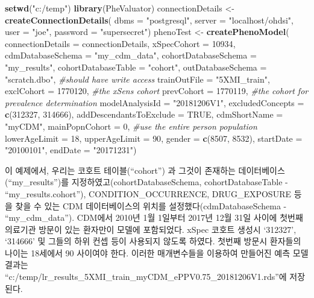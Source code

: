 \documentclass[11pt]{book}
\newenvironment{Shaded}{\begin{snugshade}}{\end{snugshade}}
\newcommand{\KeywordTok}[1]{\textcolor[rgb]{0.13,0.29,0.53}{\textbf{#1}}}
\newcommand{\DataTypeTok}[1]{\textcolor[rgb]{0.13,0.29,0.53}{#1}}
\newcommand{\DecValTok}[1]{\textcolor[rgb]{0.00,0.00,0.81}{#1}}
\newcommand{\StringTok}[1]{\textcolor[rgb]{0.31,0.60,0.02}{#1}}
\newcommand{\CommentTok}[1]{\textcolor[rgb]{0.56,0.35,0.01}{\textit{#1}}}
\newcommand{\OtherTok}[1]{\textcolor[rgb]{0.56,0.35,0.01}{#1}}
\newcommand{\NormalTok}[1]{#1}
\theoremstyle{definition}
\theoremstyle{definition}
\theoremstyle{definition}
\theoremstyle{remark}
\begin{document}
\begin{Shaded}
\begin{Highlighting}[]
\KeywordTok{setwd}\NormalTok{(}\StringTok{"c:/temp"}\NormalTok{)}
\KeywordTok{library}\NormalTok{(PheValuator)}
\NormalTok{connectionDetails <-}\StringTok{ }\KeywordTok{createConnectionDetails}\NormalTok{(}
  \DataTypeTok{dbms =} \StringTok{"postgresql"}\NormalTok{,}
  \DataTypeTok{server =} \StringTok{"localhost/ohdsi"}\NormalTok{,}
  \DataTypeTok{user =} \StringTok{"joe"}\NormalTok{,}
  \DataTypeTok{password =} \StringTok{"supersecret"}\NormalTok{)}
\NormalTok{phenoTest <-}\StringTok{ }\KeywordTok{createPhenoModel}\NormalTok{(}
  \DataTypeTok{connectionDetails =}\NormalTok{ connectionDetails,}
  \DataTypeTok{xSpecCohort =} \DecValTok{10934}\NormalTok{,}
  \DataTypeTok{cdmDatabaseSchema =} \StringTok{"my_cdm_data"}\NormalTok{,}
  \DataTypeTok{cohortDatabaseSchema =} \StringTok{"my_results"}\NormalTok{,}
  \DataTypeTok{cohortDatabaseTable =} \StringTok{"cohort"}\NormalTok{,}
  \DataTypeTok{outDatabaseSchema =} \StringTok{"scratch.dbo"}\NormalTok{, }\CommentTok{#should have write access}
  \DataTypeTok{trainOutFile =} \StringTok{"5XMI_train"}\NormalTok{,}
  \DataTypeTok{exclCohort =} \DecValTok{1770120}\NormalTok{, }\CommentTok{#the xSens cohort}
  \DataTypeTok{prevCohort =} \DecValTok{1770119}\NormalTok{, }\CommentTok{#the cohort for prevalence determination}
  \DataTypeTok{modelAnalysisId =} \StringTok{"20181206V1"}\NormalTok{,}
  \DataTypeTok{excludedConcepts =} \KeywordTok{c}\NormalTok{(}\DecValTok{312327}\NormalTok{, }\DecValTok{314666}\NormalTok{),}
  \DataTypeTok{addDescendantsToExclude =} \OtherTok{TRUE}\NormalTok{,}
  \DataTypeTok{cdmShortName =} \StringTok{"myCDM"}\NormalTok{,}
  \DataTypeTok{mainPopnCohort =} \DecValTok{0}\NormalTok{, }\CommentTok{#use the entire person population}
  \DataTypeTok{lowerAgeLimit =} \DecValTok{18}\NormalTok{,}
  \DataTypeTok{upperAgeLimit =} \DecValTok{90}\NormalTok{,}
  \DataTypeTok{gender =} \KeywordTok{c}\NormalTok{(}\DecValTok{8507}\NormalTok{, }\DecValTok{8532}\NormalTok{),}
  \DataTypeTok{startDate =} \StringTok{"20100101"}\NormalTok{,}
  \DataTypeTok{endDate =} \StringTok{"20171231"}\NormalTok{)}
\end{Highlighting}
\end{Shaded}

이 예제에서, 우리는 코호트 테이블(``cohort'') 과 그것이 존재하는
데이터베이스(``my\_results'')를 지정하였고(cohortDatabaseSchema,
cohortDatabaseTable - ``my\_results.cohort''), CONDITION\_OCCURRENCE,
DRUG\_EXPOSURE 등을 찾을 수 있는 CDM 데이터베이스의 위치를
설정했다(cdmDatabaseSchema - ``my\_cdm\_data''). CDM에서 2010년 1월
1일부터 2017년 12월 31일 사이에 첫번째 의료기관 방문이 있는 환자만이
모델에 포함되었다. xSpec 코호트 생성시 `312327', `314666' 및 그들의 하위
컨셉 등이 사용되지 않도록 하였다. 첫번째 방문시 환자들의 나이는 18세에서
90 사이여야 한다. 이러한 매개변수들을 이용하여 만들어진 예측 모델 결과는
``c:/temp/lr\_results\_5XMI\_train\_myCDM\_ePPV0.75\_20181206V1.rds''에
저장된다.
\end{document}
